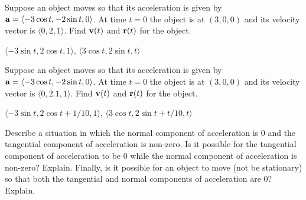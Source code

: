 \begin{exercises}
\exercise Suppose an object moves so that its acceleration is given by
${\bf a}=\langle -3\cos t,-2\sin t,0\rangle$. At time $t=0$ the object
is at $(3,0,0)$ and its velocity vector is $\langle
0,2,1\rangle$. Find ${\bf v}(t)$ and ${\bf r}(t)$ for the object.
\begin{answer} $\langle -3\sin t,2\cos t,1\rangle$,
$\langle 3\cos t, 2\sin t,t\rangle$
\end{answer}

\exercise Suppose an object moves so that its acceleration is given by
${\bf a}=\langle -3\cos t,-2\sin t,0\rangle$. At time $t=0$ the object
is at $(3,0,0)$ and its velocity vector is $\langle
0,2.1,1\rangle$. Find ${\bf v}(t)$ and ${\bf r}(t)$ for the object.
\begin{answer} $\langle -3\sin t,2\cos t+1/10,1\rangle$,
$\langle 3\cos t, 2\sin t+t/10,t\rangle$
\end{answer}

\exercise Describe a situation in which the normal component of
acceleration is 0 and the tangential component of acceleration is
non-zero. Is it possible for the tangential component of acceleration
to be 0 while the normal component of acceleration is non-zero? Explain.
Finally, is it possible for an object to move (not be stationary)
so that both the tangential and normal components of acceleration are 0?
Explain.

\end{exercises}
